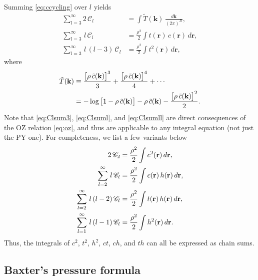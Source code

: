 \documentclass[preprint]{revtex4-1}
\newcommand{\vct}[1]{\mathbf{#1}}
\providecommand{\vr}{} %
\renewcommand{\vr}{\vct{r}}
\newcommand{\vk}{\vct{k}}
\newcommand{\dvk}{\frac{d\vk}{(2\pi)^D}}
\newcommand{\Chn}{\mathscr{C}}
\begin{document}
Summing \eqref{eq:ccycling} over $l$ yields
%
\begin{align}
      \sum_{l=3}^{\infty} 2 \, \Chn_l
  &=  \int \tilde{T}(\vk) \, \dvk,
     \label{eq:Clsum3} \\
      \sum_{l=3}^{\infty} \, l \, \Chn_l
  &=
      \frac{ \rho^2 }{2} \int t(\vr) \, c(\vr) \, d\vr,
      \label{eq:Clsuml} \\
      \sum_{l=3}^{\infty} \, l \, (l - 3) \, \Chn_l
  &=  \frac{ \rho^2 }{ 2 }
      \int t^2(\vr) \, d\vr,
\label{eq:Clsumll}
\end{align}
%
where
\begin{align}
  \tilde{T}(\vk)
&\equiv
    \frac{ \big[ \rho \, \tilde{c}(\vk) \big]^3 } { 3 }
  + \frac{ \big[ \rho \, \tilde{c}(\vk) \big]^4 } { 4 }
  + \cdots
\notag \\
&=
  - \log\big[1 - \rho \, \tilde{c}(\vk) \big]
  - \rho \, \tilde{c}(\vk)
  - \frac{ \big[ \rho \, \tilde{c}(\vk) \big]^2 } { 2 }.
  \label{eq:logrhoc}
\end{align}
%
Note that \eqref{eq:Clsum3}, \eqref{eq:Clsuml}, and \eqref{eq:Clsumll}
  are direct consequences of the OZ relation \eqref{eq:oz},
  and thus are applicable to any integral equation (not just the PY one).
%
For completeness, we list a few variants below
%
\begin{align}
      2 \, \Chn_2
  &=
      \frac{ \rho^2 }{2} \int c^2(\vr) \, d\vr,
\notag \\
%
      \sum_{l=2}^{\infty} \, l \, \Chn_l
  &=
      \frac{ \rho^2 }{2} \int c(\vr) \, h(\vr) \, d\vr,
\notag \\
%
      \sum_{l=2}^{\infty} \, l \, (l - 2) \, \Chn_l
  &=  \frac{ \rho^2 }{ 2 }
      \int t(\vr) \, h(\vr) \, d\vr,
\label{eq:Clsum_th} \\
%
      \sum_{l=1}^{\infty} \, l \, (l - 1) \, \Chn_l
  &=  \frac{ \rho^2 }{ 2 }
      \int h^2(\vr) \, d\vr.
\notag
\end{align}
%
Thus, the integrals of $c^2$, $t^2$, $h^2$, $ct$, $ch$, and $th$
can all be expressed as chain sums.



\subsection{Baxter's pressure formula}
\end{document}
